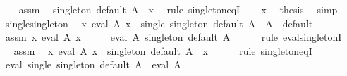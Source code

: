 \begin{isabellebody}
\isanewline
\ \ \isamarkupfalse%
\ assm\ \isamarkupfalse%
\ {\isachardoublequoteopen}singleton\ default\ A\ {\isacharequal}{\kern0pt}\ x{\isachardoublequoteclose}\ \isamarkupfalse%
\ {\isacharparenleft}{\kern0pt}rule\ singleton{\isacharunderscore}{\kern0pt}eqI{\isacharparenright}{\kern0pt}\isanewline
\ \ \isamarkupfalse%
\ x\ \isamarkupfalse%
\ {\isacharquery}{\kern0pt}thesis\ \isamarkupfalse%
\ simp\isanewline
{}\isamarkupfalse%
%
\endisatagproof
{\isafoldproof}%
%
\isadelimproof
\isanewline
%
\endisadelimproof
\isanewline
{}\isamarkupfalse%
\ single{\isacharunderscore}{\kern0pt}singleton{\isacharcolon}{\kern0pt}\isanewline
\ \ {\isachardoublequoteopen}{\isasymexists}{\isacharbang}{\kern0pt}x{\isachardot}{\kern0pt}\ eval\ A\ x\ {\isasymLongrightarrow}\ single\ {\isacharparenleft}{\kern0pt}singleton\ default\ A{\isacharparenright}{\kern0pt}\ {\isacharequal}{\kern0pt}\ A{\isachardoublequoteclose}\ \ default\isanewline
%
\isadelimproof
%
\endisadelimproof
%
\isatagproof
{}\isamarkupfalse%
\ {\isacharminus}{\kern0pt}\isanewline
\ \ \isamarkupfalse%
\ assm{\isacharcolon}{\kern0pt}\ {\isachardoublequoteopen}{\isasymexists}{\isacharbang}{\kern0pt}x{\isachardot}{\kern0pt}\ eval\ A\ x{\isachardoublequoteclose}\isanewline
\ \ \isamarkupfalse%
\ \isamarkupfalse%
\ {\isachardoublequoteopen}eval\ A\ {\isacharparenleft}{\kern0pt}singleton\ default\ A{\isacharparenright}{\kern0pt}{\isachardoublequoteclose}\isanewline
\ \ \ \ \isamarkupfalse%
\ {\isacharparenleft}{\kern0pt}rule\ eval{\isacharunderscore}{\kern0pt}singletonI{\isacharparenright}{\kern0pt}\isanewline
\ \ \isamarkupfalse%
\ \isamarkupfalse%
\ assm\ \isamarkupfalse%
\ {\isachardoublequoteopen}{\isasymAnd}x{\isachardot}{\kern0pt}\ eval\ A\ x\ {\isasymLongrightarrow}\ singleton\ default\ A\ {\isacharequal}{\kern0pt}\ x{\isachardoublequoteclose}\isanewline
\ \ \ \ \isamarkupfalse%
\ {\isacharparenleft}{\kern0pt}rule\ singleton{\isacharunderscore}{\kern0pt}eqI{\isacharparenright}{\kern0pt}\isanewline
\ \ \isamarkupfalse%
\ \isamarkupfalse%
\ {\isachardoublequoteopen}eval\ {\isacharparenleft}{\kern0pt}single\ {\isacharparenleft}{\kern0pt}singleton\ default\ A{\isacharparenright}{\kern0pt}{\isacharparenright}{\kern0pt}\ {\isacharequal}{\kern0pt}\ eval\ A{\isachardoublequoteclose}\isanewline

\end{isabellebody}
